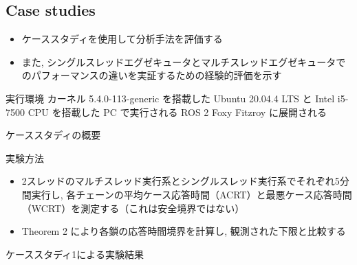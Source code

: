 \subsection{Case studies}
\label{ssec: case studies}

\begin{frame}{}
    \begin{itemize}
        \item ケーススタディを使用して分析手法を評価する
        \item また, シングルスレッドエグゼキュータとマルチスレッドエグゼキュータでのパフォーマンスの違いを実証するための経験的評価を示す
    \end{itemize}
\end{frame}

\begin{frame}{実行環境}
    カーネル 5.4.0-113-generic を搭載した Ubuntu 20.04.4 LTS と Intel i5-7500 CPU を搭載した PC で実行される ROS 2 Foxy Fitzroy に展開される
\end{frame}


\begin{frame}{ケーススタディの概要}
\end{frame}

\begin{frame}{実験方法}
    \begin{itemize}
        \item 2スレッドのマルチスレッド実行系とシングルスレッド実行系でそれぞれ5分間実行し, 各チェーンの平均ケース応答時間（ACRT）と最悪ケース応答時間（WCRT）を測定する（これは安全境界ではない）
        \item Theorem 2 により各鎖の応答時間境界を計算し, 観測された下限と比較する
    \end{itemize}
\end{frame}


\begin{frame}{ケーススタディ1による実験結果}
\end{frame}

